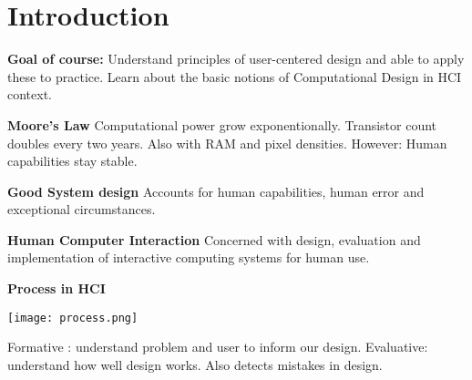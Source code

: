 \section{Introduction}

\textbf{Goal of course:} Understand principles of user-centered design and able to apply these to practice.
Learn about the basic notions of Computational Design in HCI context. \medskip


\textbf{Moore's Law}
Computational power grow exponentionally. Transistor count doubles every two years. Also with RAM and pixel densities. 
However: Human capabilities stay stable.\medskip

\textbf{Good System design}
Accounts for human capabilities, human error and exceptional circumstances. \medskip

\textbf{Human Computer Interaction}
Concerned with design, evaluation and implementation of interactive computing systems for human use. \medskip

\textbf{Process in HCI}

\begin{center}
	\texttt{[image: process.png]}
\end{center}

Formative : understand problem and user to inform our design. \medskip
Evaluative: understand how well design works. Also detects mistakes in design. \medskip

